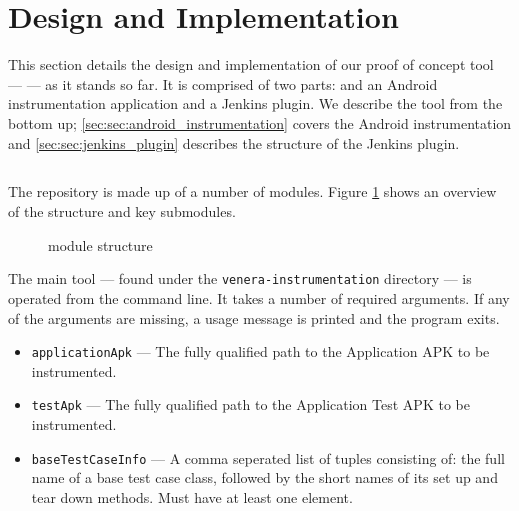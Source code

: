 \section{Design and Implementation}
\label{sec:imp}

This section details the design and implementation of our proof of concept tool
--- \venera --- as it stands so far. It is comprised of two parts: and an
Android instrumentation application and a Jenkins plugin.
We describe the tool from the bottom up;
\autoref{sec:sec:android_instrumentation} covers the Android instrumentation and
\autoref{sec:sec:jenkins_plugin} describes the structure of the Jenkins plugin.

\subsection{\venera}
\label{sec:sec:android_instrumentation}

The \venera repository\cite{heisentestInstrumentation} is made up of a number of
modules. Figure \ref{fig:repo_structure} shows an overview of the structure and
key submodules.

\begin{figure}[h]
\caption{\venera module structure}
\label{fig:repo_structure}
\end{figure}

The main tool --- found under the {\tt venera-instrumentation} directory --- is
operated from the command line. It takes a number of required arguments. If any
of the arguments are missing, a usage message is printed and the program exits.

\begin{itemize}
    \item {\tt applicationApk} --- The fully qualified path to the Application
    APK to be instrumented.
    \item {\tt testApk} --- The fully qualified path to the Application Test APK
    to be instrumented.
    \item {\tt baseTestCaseInfo} --- A comma seperated list of tuples consisting
    of: the full name of a base test case class, followed by the short names of
    its set up and tear down methods. Must have at least one element.
\end{itemize}

